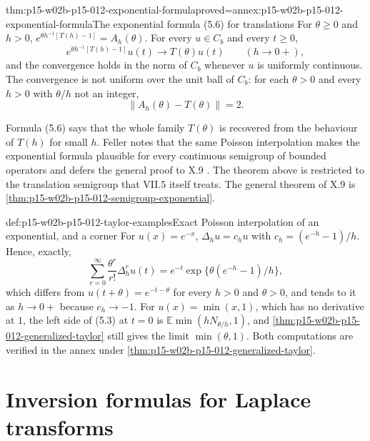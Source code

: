 \begin{hbtheorem}{thm:p15-w02b-p15-012-exponential-formula}{proved=annex:p15-w02b-p15-012-exponential-formula}{The exponential formula (5.6) for translations}
For \(\theta\geq0\) and \(h>0\), \(e^{\theta h^{-1}[T(h)-1]}=A_h(\theta)\).
For every \(u\in C_b\) and every \(t\geq0\),
\[
 e^{\theta h^{-1}[T(h)-1]}u(t)\longrightarrow T(\theta)u(t)
 \qquad(h\to0+),
 \tag{5.6}
\]
and the convergence holds in the norm of \(C_b\) whenever \(u\) is uniformly
continuous. The convergence is not uniform over the unit ball of \(C_b\):
for each \(\theta>0\) and every \(h>0\) with \(\theta/h\) not an integer,
\[
 \|A_h(\theta)-T(\theta)\|=2 .
\]
\end{hbtheorem}

Formula (5.6) says that the whole family \(T(\theta)\) is recovered from the
behaviour of \(T(h)\) for small \(h\). Feller notes that the same Poisson
interpolation makes the exponential formula plausible for every continuous
semigroup of bounded operators and defers the general proof to X.9
\cite[vol.~II, VII.5, p.~232]{Feller1971ProbabilityII}. The theorem above
is restricted to the translation semigroup that VII.5 itself treats. The
general theorem of X.9 is \cref{thm:p15-w02b-p15-012-semigroup-exponential}.

\begin{hbexample}{def:p15-w02b-p15-012-taylor-examples}{Exact Poisson interpolation of an exponential, and a corner}
For \(u(x)=e^{-x}\), \(\Delta_h u=c_h u\) with \(c_h=(e^{-h}-1)/h\).
Hence, exactly,
\[
 \sum_{r=0}^\infty\frac{\theta^r}{r!}\Delta_h^r u(t)
     =e^{-t}\exp\bigl\{\theta(e^{-h}-1)/h\bigr\},
\]
which differs from \(u(t+\theta)=e^{-t-\theta}\) for every \(h>0\) and
\(\theta>0\), and tends to it as \(h\to0+\) because \(c_h\to-1\).
For \(u(x)=\min(x,1)\), which has no derivative at \(1\), the left side of
(5.3) at \(t=0\) is \(\mathbb E\min(hN_{\theta/h},1)\), and
\cref{thm:p15-w02b-p15-012-generalized-taylor} still gives the limit
\(\min(\theta,1)\). Both computations are verified in the annex under
\cref{thm:p15-w02b-p15-012-generalized-taylor}.
\end{hbexample}

\section{Inversion formulas for Laplace transforms}
\label{sec:p15-w02b-p15-012-laplace}

